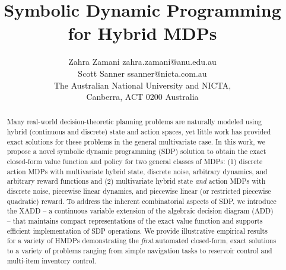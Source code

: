 \documentclass[twoside,11pt]{article}
\begin{document}
\title{Symbolic Dynamic Programming for Hybrid MDPs}

\author{\name Zahra Zamani \email zahra.zamani@anu.edu.au \\
       \name Scott Sanner \email ssanner@nicta.com.au \\
       \addr The Australian National University and NICTA,\\
       Canberra, ACT 0200 Australia       
}

\maketitle


\begin{abstract}
%
%
Many real-world decision-theoretic planning problems are naturally
modeled using hybrid (continuous and discrete) state and action
spaces, yet little work has provided exact solutions for these
problems in the general multivariate case.  In this work, we propose a
novel symbolic dynamic programming (SDP) solution to obtain the exact
closed-form value function and policy for two general classes of MDPs:
(1) discrete action MDPs with multivariate hybrid state, discrete
noise, arbitrary dynamics, and arbitrary reward functions and (2)
multivariate hybrid state \emph{and} action MDPs with discrete noise,
piecewise linear dynamics, and piecewise linear (or restricted
piecewise quadratic) reward.  To address the inherent combinatorial
aspects of SDP, we introduce the XADD -- a continuous variable
extension of the algebraic decision diagram (ADD) -- that maintains
compact representations of the exact value function and supports
efficient implementation of SDP operations.  We provide illustrative
empirical results for a variety of HMDPs demonstrating the
\emph{first} automated closed-form, exact solutions to a variety of
problems ranging from simple navigation tasks to reservoir control and
multi-item inventory control.
\end{abstract}
\end{document}

